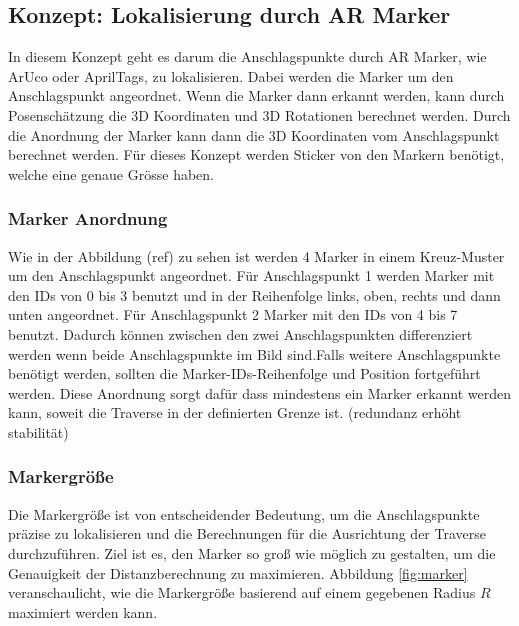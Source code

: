\subsection{Konzept: Lokalisierung durch AR Marker}

In diesem Konzept geht es darum die Anschlagspunkte durch AR Marker, wie ArUco oder AprilTags, zu lokalisieren. Dabei werden die Marker um den Anschlagspunkt angeordnet. Wenn die Marker dann erkannt werden, kann durch Posenschätzung die 3D Koordinaten und 3D Rotationen berechnet werden. Durch die Anordnung der Marker kann dann die 3D Koordinaten vom Anschlagspunkt berechnet werden. 
Für dieses Konzept werden Sticker von den Markern benötigt, welche eine genaue Grösse haben. 

\subsubsection{Marker Anordnung}

Wie in der Abbildung (ref) zu sehen ist werden 4 Marker in einem Kreuz-Muster um den Anschlagspunkt angeordnet. Für Anschlagspunkt 1 werden Marker mit den IDs von 0 bis 3 benutzt und in der Reihenfolge links, oben, rechts und dann unten angeordnet. Für Anschlagspunkt 2 Marker mit den IDs von 4 bis 7 benutzt. Dadurch können zwischen den zwei Anschlagspunkten differenziert werden wenn beide Anschlagspunkte im Bild sind.Falls weitere Anschlagspunkte benötigt werden, sollten die Marker-IDs-Reihenfolge und Position fortgeführt werden. Diese Anordnung sorgt dafür dass mindestens ein Marker erkannt werden kann, soweit die Traverse in der definierten Grenze ist. 
(redundanz erhöht stabilität)

\clearpage
\subsubsection{Markergröße}

Die Markergröße ist von entscheidender Bedeutung, um die Anschlagspunkte präzise 
zu lokalisieren und die Berechnungen für die Ausrichtung der Traverse durchzuführen. 
Ziel ist es, den Marker so groß wie möglich zu gestalten, um die Genauigkeit der 
Distanzberechnung zu maximieren. Abbildung \ref{fig:marker} veranschaulicht, wie die Markergröße 
basierend auf einem gegebenen Radius \( R \) maximiert werden kann.

